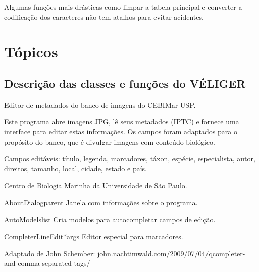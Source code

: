 \documentclass[letterpaper,10pt,portuguese]{manual}
\begin{document}
Algumas funções mais drásticas como limpar a tabela principal e converter a
codificação dos caracteres não tem atalhos para evitar acidentes.


\chapter{Tópicos}

\resetcurrentobjects
\hypertarget{--doc-fullapi}{}

\section{Descrição das classes e funções do VÉLIGER}
\hypertarget{module-veliger}{}
\modulesynopsis{}
Editor de metadados do banco de imagens do CEBIMar-USP.

Este programa abre imagens JPG, lê seus metadados (IPTC) e fornece uma
interface para editar estas informações. Os campos foram adaptados para o
propósito do banco, que é divulgar imagens com conteúdo biológico.

Campos editáveis: título, legenda, marcadores, táxon, espécie, especialista,
autor, direitos, tamanho, local, cidade, estado e país.

Centro de Biologia Marinha da Universidade de São Paulo.

\hypertarget{veliger.AboutDialog}{}\begin{classdesc}{AboutDialog}{parent}
Janela com informações sobre o programa.
\end{classdesc}

\hypertarget{veliger.AutoModels}{}\begin{classdesc}{AutoModels}{list}
Cria modelos para autocompletar campos de edição.
\end{classdesc}

\hypertarget{veliger.CompleterLineEdit}{}\begin{classdesc}{CompleterLineEdit}{*args}
Editor especial para marcadores.

Adaptado de John Schember:
john.nachtimwald.com/2009/07/04/qcompleter-and-comma-separated-tags/
\end{classdesc}
\end{document}
